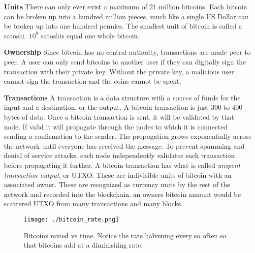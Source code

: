 \documentclass[conference]{IEEEtran}
\begin{document}
\textbf{Units} There can only ever exist a maximum of 21 million bitcoins. Each bitcoin can be broken up into a hundred million pieces, much like a single US Dollar can be broken up into one hundred pennies. The smallest unit of bitcoin is called a satoshi. $10^8$ satoshis equal one whole bitcoin. \cite{units}

\textbf{Ownership} Since bitcoin has no central authority, transactions are made peer to peer. A user can only send bitcoins to another user if they can digitally sign the transaction with their private key. Without the private key, a malicious user cannot sign the transaction and the coins cannot be spent. \cite{ownership}

\textbf{Transactions} A transaction is a data structure with a source of funds for the input and a destination, or the output. A bitcoin transaction is just 300 to 400 bytes of data. Once a bitcoin transaction is sent, it will be validated by that node. If valid it will propagate through the nodes to which it is connected sending a confirmation to the sender. The propogation grows exponentially across the network until everyone has received the message. To prevent spamming and denial of service attacks, each node independently validates each transaction before propagating it further. A bitcoin transaction has what is called \textit{unspent transaction output}, or UTXO. These are indivisible units of bitcoin with an associated owner. These are recognized as currency units by the rest of the network and recorded into the blockchain. an owners bitcoin amount would be scattered UTXO from many transactions and many blocks. \cite{trans}

\begin{figure}[ht!]
\texttt{[image: ./bitcoin\_rate.png]} 
\caption{Bitcoins mined vs time. Notice the rate halvening every so often so that bitcoins add at a diminishing rate.}
\end{figure}
\end{document}
